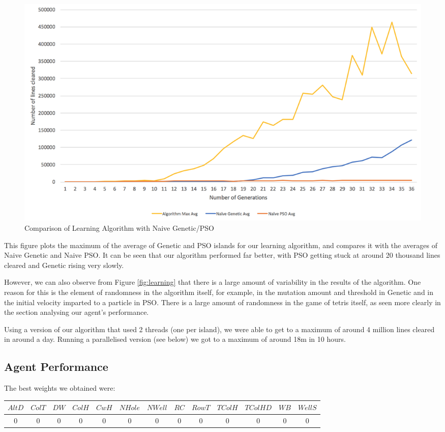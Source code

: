 \documentclass[12pt]{article}
\begin{document}
	\begin{figure}[h]
		\includegraphics[scale=0.3]{learning/Naive}
		\centering
		\caption{Comparison of Learning Algorithm with Naive Genetic/PSO}
		\label{fig:naive}
	\end{figure}

	This figure plots the maximum of the average of Genetic and PSO islands for
	our learning algorithm, and compares it with the averages of Naive Genetic and
	Naive PSO. It can be seen that our algorithm performed far better, with PSO
	getting stuck at around 20 thousand lines cleared and Genetic rising very slowly.

	However, we can also observe from Figure \ref{fig:learning} that there is a large amount
	of variability in the results of the algorithm. One reason for this is the element
	of randomness in the algorithm itself, for example, in the mutation amount and threshold
	in Genetic and in the initial velocity imparted to a particle in PSO. There is
	a large amount of randomness in the game of tetris itself, as seen more clearly
	in the section analysing our agent's performance.

	Using a version of our algorithm that used 2 threads (one per island),
	we were able to get to a maximum of around 4 million lines cleared in
	around a day. Running a parallelised version (see below) we got to a maximum of
	around 18m in 10 hours.\\

	\subsection{Agent Performance}
	The best weights we obtained were:\\

	\begin{tabular}{ | c | c | c | c | c | c | c | c | c | c | c | c | c | }
		\hline
		$AltD$ & $ColT$ & $DW$ & $ColH$ & $CwH$ & $NHole$ & $NWell$ & $RC$ & $RowT$ & $TColH$ & $TColHD$ & $WB$ & $WellS$ \\ \hline
		0 & 0 & 0 & 0 & 0 & 0 & 0 & 0 & 0 & 0 & 0 & 0 & 0 \\ \hline
	\end{tabular}\\[0.25em]
\end{document}
